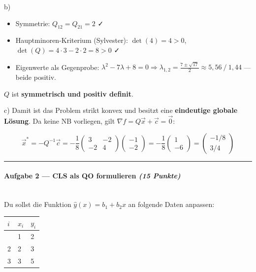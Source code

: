 \documentclass[11pt, a4paper]{article}
\begin{document}
b)

\begin{itemize}
  \item Symmetrie: $Q_{12} = Q_{21} = 2$ ✓
  \item Hauptminoren-Kriterium (Sylvester): $\det(4) = 4 > 0$, $\det(Q) = 4\cdot 3 - 2\cdot 2 = 8 > 0$ ✓
  \item Eigenwerte als Gegenprobe: $\lambda^2 - 7\lambda + 8 = 0 \Rightarrow \lambda_{1,2} = \tfrac{7 \pm \sqrt{17}}{2} \approx 5{,}56\ /\ 1{,}44$ — beide positiv.
\end{itemize}

$Q$ ist \textbf{symmetrisch und positiv definit}.


c) Damit ist das Problem strikt konvex und besitzt eine \textbf{eindeutige globale Lösung}. Da keine NB vorliegen, gilt $\nabla f = Q\vec{x} + \vec{c} = \vec{0}$:


\[
\vec{x}^* = -Q^{-1}\vec{c} = -\frac{1}{8}\begin{pmatrix} 3 & -2 \\ -2 & 4 \end{pmatrix}\begin{pmatrix} -1 \\ -2 \end{pmatrix} = -\frac{1}{8}\begin{pmatrix} 1 \\ -6 \end{pmatrix} = \begin{pmatrix} -1/8 \\ 3/4 \end{pmatrix}
\]



\noindent\textcolor{rulegray}{\rule{\linewidth}{0.4pt}}


\paragraph{Aufgabe 2 — CLS als QO formulieren \textit{(15 Punkte)}}\mbox{}\\[2pt]

Du sollst die Funktion $\hat{y}(x) = b_1 + b_2 x$ an folgende Daten anpassen:



{\small
\begin{tabularx}{\linewidth}{XXX}
\hline
\rowcolor{tableheadbg}
{\color{white}\textbf{$i$}} & {\color{white}\textbf{$x_i$}} & {\color{white}\textbf{$y_i$}} \\[2pt]
\hline
\endhead
\hline
\endfoot
1 & 1 & 2 \\
2 & 2 & 3 \\
3 & 3 & 5 \\
\end{tabularx}
}
\end{document}
